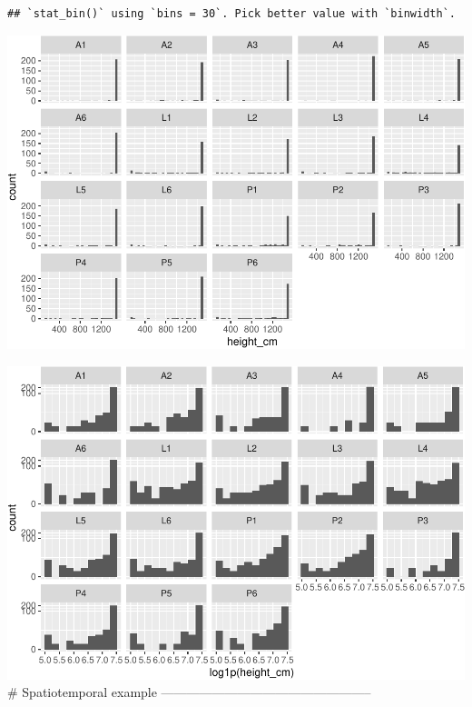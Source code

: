 \documentclass[]{article}
\newenvironment{Shaded}{\begin{snugshade}}{\end{snugshade}}
\newcommand{\DataTypeTok}[1]{\textcolor[rgb]{0.13,0.29,0.53}{#1}}
\newcommand{\DecValTok}[1]{\textcolor[rgb]{0.00,0.00,0.81}{#1}}
\newcommand{\FloatTok}[1]{\textcolor[rgb]{0.00,0.00,0.81}{#1}}
\newcommand{\KeywordTok}[1]{\textcolor[rgb]{0.13,0.29,0.53}{\textbf{#1}}}
\newcommand{\NormalTok}[1]{#1}
\newcommand{\OperatorTok}[1]{\textcolor[rgb]{0.81,0.36,0.00}{\textbf{#1}}}
\newcommand{\StringTok}[1]{\textcolor[rgb]{0.31,0.60,0.02}{#1}}
\begin{document}
\begin{verbatim}
## `stat_bin()` using `bins = 30`. Pick better value with `binwidth`.
\end{verbatim}

\includegraphics{R_tidyverse_for_geographers_files/figure-latex/unnamed-chunk-24-4.pdf}

\begin{Shaded}
\end{Shaded}

\includegraphics{R_tidyverse_for_geographers_files/figure-latex/unnamed-chunk-24-5.pdf}
\# Spatiotemporal example
--------------------------------------------------
\end{document}

